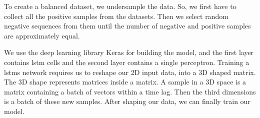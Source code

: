 To create a balanced dataset, we undersample the data. So, we first have to collect all the positive samples from the datasets. Then we select random negative sequences from them until the number of negative and positive samples are approximately equal.

We use the deep learning library Keras for building the model, and the first layer contains \ac{lstm} cells and the second layer contains a single perceptron. Training a \acp{lstm} network requires us to reshape our 2D input data, into a 3D shaped matrix. The 3D shape represents matrices inside a matrix. A sample in a 3D space is a matrix containing a batch of vectors within a time lag. Then the third dimensions is a batch of these new samples. After shaping our data, we can finally train our model.
